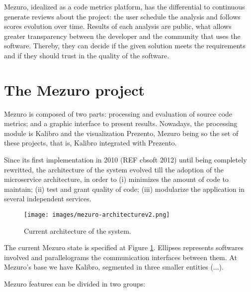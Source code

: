 \documentclass{llncs}
\begin{document}
Mezuro, idealized as a code metrics platform, has the differential to
continuous generate reviews about the project: the user schedule the
analysis and follows scores evolution over time. Results of each analysis
are public, what allows greater transparency between the developer and the
community that uses the software. Thereby, they can decide if the given solution
meets the requirements and if they should trust in the quality of the software.

\section{The Mezuro project}
\label{sec:mezuro}

Mezuro is composed of two parts: processing and evaluation of source code
metrics; and a graphic interface to present results. Nowadays, the processing
module is Kalibro and the visualization Prezento, Mezuro being so the set of
these projects, that is, Kalibro integrated with Prezento.

Since its first implementation in 2010 (REF cbsoft 2012) until being completely
rewritted, the architecture of the system evolved till the adoption of the
microservice architecture, in order to (i) minimizes the amount of code to
maintain;
(ii) test and grant quality of code;
(iii) modularize the application in several independent services.

\begin{figure}[H]
  \centering
    \texttt{[image: images/mezuro-architecturev2.png]}
  \caption{Current architecture of the system.}
  \label{fig:architecture-2}
\end{figure}


The current Mezuro state is specified at Figure \ref{fig:architecture-2}. Ellipses represents
softwares involved and parallelograms the communication interfaces between them. At Mezuro's
base we have Kalibro, segmented in three smaller entities (...).

Mezuro features can be divided in two groups:
\end{document}
